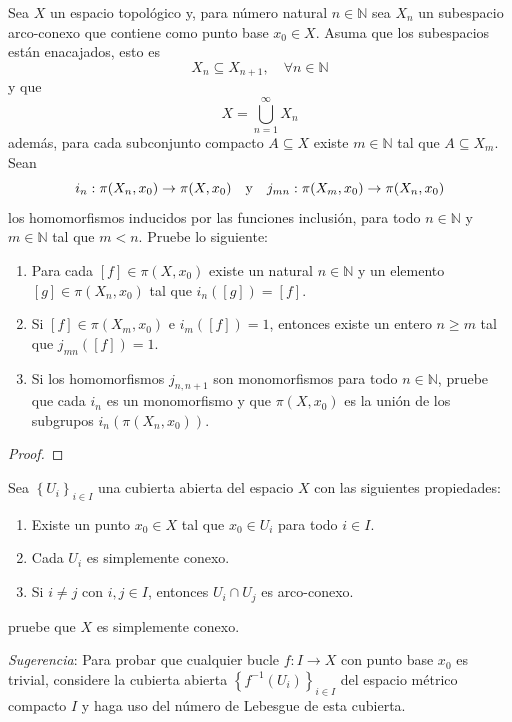\documentclass[12pt]{report}
\theoremstyle{largebreak}
\newcommand\cf[3]{\ensuremath{#1:#2\rightarrow#3}}
\begin{document}
    \begin{excer}
        Sea $X$ un espacio topológico y, para número natural $n\in\mathbb{N}$ sea $X_n$ un subespacio arco-conexo que contiene como punto base $x_0\in X$. Asuma que los subespacios están enacajados, esto es
        \begin{equation*}
            X_n\subseteq X_{ n+1},\quad\forall n\in\mathbb{N}
        \end{equation*}
        y que
        \begin{equation*}
            X=\bigcup_{ n=1}^{\infty}X_n
        \end{equation*}
        además, para cada subconjunto compacto $A\subseteq X$ existe $m\in\mathbb{N}$ tal que $A\subseteq X_m$. Sean
        \begin{equation*}
            \cf{i_n}{\pi(X_n,x_0)}{\pi(X,x_0)}\quad\textup{y}\quad \cf{j_{ mn}}{\pi(X_m,x_0)}{\pi(X_n,x_0)}
        \end{equation*}
        los homomorfismos inducidos por las funciones inclusión, para todo $n\in\mathbb{N}$ y $m\in\mathbb{N}$ tal que $m<n$. Pruebe lo siguiente:
        \begin{enumerate}
            \item Para cada $[f]\in\pi(X,x_0)$ existe un natural $n\in\mathbb{N}$ y un elemento $[g]\in\pi(X_n,x_0)$ tal que $i_n([g])=[f]$.
            \item Si $[f]\in\pi(X_m,x_0)$ e $i_m([f])=1$, entonces existe un entero $n\geq m$ tal que $j_{ mn}([f])=1$.
            \item Si los homomorfismos $j_{ n,n+1}$ son monomorfismos para todo $n\in\mathbb{N}$, pruebe que cada $i_n$ es un monomorfismo y que $\pi(X,x_0)$ es la unión de los subgrupos $i_n(\pi(X_n,x_0))$.
        \end{enumerate}
    \end{excer}

    \begin{proof}
        
    \end{proof}

    \begin{excer}
        Sea $\left\{U_i \right\}_{ i\in I}$ una cubierta abierta del espacio $X$ con las siguientes propiedades:
        \renewcommand{\theenumi}{\alph{enumi}}
        \begin{enumerate}
            \item Existe un punto $x_0\in X$ tal que $x_0\in U_i$ para todo $i\in I$.
            \item Cada $U_i$ es simplemente conexo.
            \item Si $i\neq j$ con $i,j\in I$, entonces $U_i\cap U_j$ es arco-conexo. 
        \end{enumerate}
        pruebe que $X$ es simplemente conexo.
        
        \textit{Sugerencia}: Para probar que cualquier bucle $\cf{f}{I}{X}$ con punto base $x_0$ es trivial, considere la cubierta abierta $\left\{f^{-1}(U_i) \right\}_{ i\in I}$ del espacio métrico compacto $I$ y haga uso del número de Lebesgue de esta cubierta.
    \end{excer}
\end{document}
